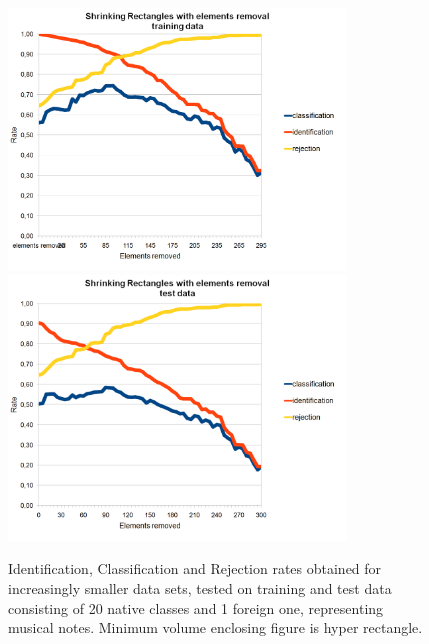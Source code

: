 \begin{figure}[htp]
	\centering
	\includegraphics[width=0.80\textwidth]{Figures/charts/MUSIC_NOTES/DIGITS_ShrinkingRectanglesElementsRemovalTraining.png}
	\hspace{12pt}
	\includegraphics[width=0.80\textwidth]{Figures/charts/MUSIC_NOTES/DIGITS_ShrinkingRectanglesElementsRemovalTest.png}
	\caption{ Identification, Classification and Rejection rates obtained for increasingly smaller data sets, tested on training and test data consisting of 20 native classes and 1 foreign one, representing musical notes. Minimum volume enclosing figure is hyper rectangle. }
\end{figure}

